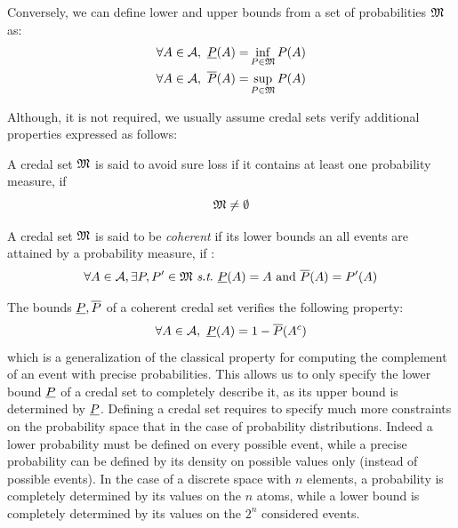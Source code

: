 Conversely, we can define lower and upper bounds from a set of probabilities ${\mathfrak{M}}$ as:
\begin{align*}
    \forall A\in\mathcal{A},~{\underline{P}}(A) =& \inf_{P\in{\mathfrak{M}}}P(A)\\
    \forall A\in\mathcal{A},~\overline{P}(A) =& \sup_{P\in{\mathfrak{M}}}P(A)
\end{align*}

Although, it is not required, we usually assume credal sets verify additional properties expressed as follows:
\begin{definition}\label{def:coherence_sure_loss}
    A credal set ${\mathfrak{M}}$ is said to avoid sure loss if it contains at least one probability measure, \ie if
    \begin{equation}
        {\mathfrak{M}} \neq \emptyset\label{eq:avoid_sure_loss}
    \end{equation}
    
    A credal set ${\mathfrak{M}}$ is said to be \textit{coherent} if its lower bounds an all events are attained by a probability measure, \ie if :
    \begin{equation}
        \forall A\in\mathcal{A}, \exists P, P'\in\M~\st~\low(A)=A \text{ and } \overline{P}(A)=P'(A) 
    \end{equation}
\end{definition}
The bounds ${\underline{P}}, \overline{P}$ of a coherent credal set verifies the following property:
\begin{equation}
    \forall A\in\mathcal{A}, ~{\underline{P}}(A) = 1 - \overline{P}(A^c)\label{eq:lower_proba_complement}
\end{equation}
which is a generalization of the classical property for computing the complement of an event with precise probabilities. This allows us to only specify the lower bound ${\underline{P}}$ of a credal set to completely describe it, as its upper bound is determined by ${\underline{P}}$. Defining a credal set requires to specify much more constraints on the probability space that in the case of probability distributions. Indeed a lower probability must be defined on every possible event, while a precise probability can be defined by its density on possible values only (instead of possible events). In the case of a discrete space with $n$ elements, a probability is completely determined by its values on the $n$ atoms, while a lower bound is completely determined by its values on the $2^n$ considered events.


